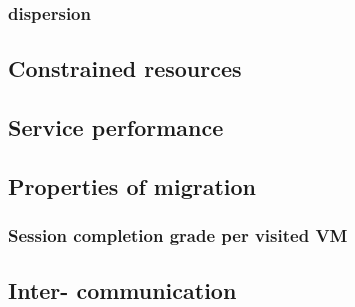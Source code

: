 \subsubsection{\Dc{} dispersion}

\subsection{Constrained \dc{} resources}

\subsection{Service performance}

\subsection{Properties of migration}
\subsubsection{Session completion grade per visited VM}

\subsection{Inter-\Dc{} communication}